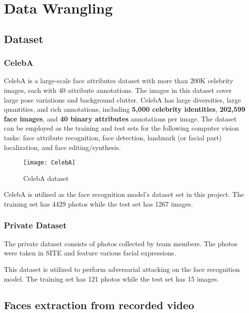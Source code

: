 \section{Data Wrangling}

\subsection{Dataset}

\subsubsection{CelebA} \label{sec:CelebA}

CelebA is a large-scale face attributes dataset with more than 200K celebrity images, each with 40 attribute annotations. The images in this dataset cover large pose variations and background clutter. CelebA has large diversities, large quantities, and rich annotations, including \textbf{5,000 celebrity identities}, \textbf{202,599 face images}, and \textbf{40 binary attributes} annotations per image. The dataset can be employed as the training and test sets for the following computer vision tasks: face attribute recognition, face detection, landmark (or facial part) localization, and face editing/synthesis.

\begin{figure}[h]
\centering
\texttt{[image: CelebA]}
\caption{CelebA dataset}
\label{fig:CelebA}
\end{figure}

CelebA is utilised as the face recognition model's dataset set in this project. The training set has 4429 photos while the test set has 1267 images.

\subsubsection{Private Dataset}

The private dataset consists of photos collected by team members. The photos were taken in SITE and feature various facial expressions.

This dataset is utilized to perform adversarial attacking on the face recognition model. The training set has 121 photos while the test set has 15 images.

\subsection{Faces extraction from recorded video}


